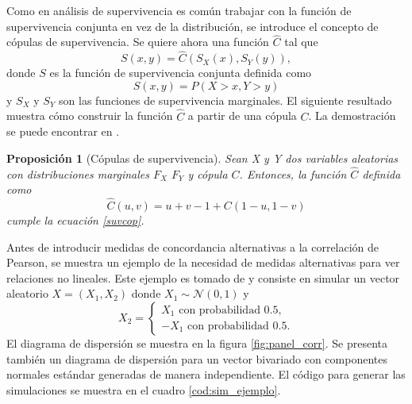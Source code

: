 \documentclass[11pt,a4paper]{article}
\newtheorem{proposition}{Proposición}[subsection]
\begin{document}
Como en análisis de supervivencia es común trabajar con la función de supervivencia conjunta en vez de la distribución, se introduce el concepto de cópulas de supervivencia. Se quiere ahora una función $\widehat{C}$ tal que
\begin{equation} \label{suvcop}
S(x, y) = \widehat{C}(S_X(x), S_Y(y)),
\end{equation}
donde $S$ es la función de supervivencia conjunta definida como $$S(x, y ) = P\left( X>x, Y>y\right)$$ y $S_X$ y $S_Y$ son las funciones de supervivencia marginales. El siguiente resultado muestra cómo construir la función $\widehat{C}$ a partir de una cópula $C$. La demostración se puede encontrar en \citet{nelsen}.

\begin{proposition}[Cópulas de supervivencia]
\label{def_cop_surv}
Sean X y Y dos variables aleatorias con distribuciones marginales $F_X$ $F_Y$ y cópula $C$. Entonces, la función $\widehat{C}$ definida como $$\widehat{C}(u, v) = u + v - 1 + C(1-u, 1-v)$$ cumple la ecuación \eqref{suvcop}.
\end{proposition}

Antes de introducir medidas de concordancia alternativas a la correlación de Pearson, se muestra un ejemplo de la necesidad de medidas alternativas para ver relaciones no lineales. Este ejemplo es tomado de \citet{copula_modeling} y consiste en simular un vector aleatorio $X = (X_1, X_2)$ donde $X_1 \sim \mathcal{N}(0, 1)$ y $$X_2 = \begin{cases}
X_1  \text{ con probabilidad } 0.5,\\
-X_1 \text{ con probabilidad }  0.5.
\end{cases}$$ El diagrama de dispersión se muestra en la figura \ref{fig:panel_corr}. Se presenta también un diagrama de dispersión para un vector bivariado con componentes normales estándar generadas de manera independiente. El código para generar las simulaciones se muestra en el cuadro \ref{cod:sim_ejemplo}.
\end{document}
